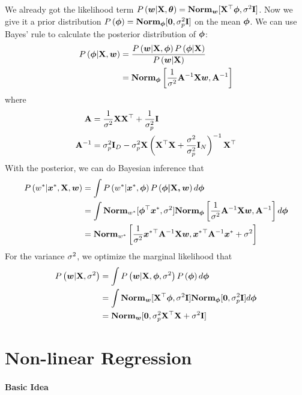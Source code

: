 We already got the likelihood term $P\left(\boldsymbol{w}|\mathbf{X},\boldsymbol{\theta}\right)=\mathbf{Norm}_{\boldsymbol{w}}[\mathbf{X}{}^\top\boldsymbol{\phi},\sigma^2\mathbf{I}]$. Now we give it a prior distribution $P\left(\boldsymbol{\phi}\right)=\mathbf{Norm}_{\boldsymbol{\phi}}[\boldsymbol{0},\sigma_p^2\mathbf{I}]$ on the mean $\boldsymbol{\phi}$. We can use Bayes' rule to calculate the posterior distribution of $\boldsymbol{\phi}$:
\begin{align*}
	P\left(\boldsymbol{\phi}|\mathbf{X},\boldsymbol{w}\right)&=\frac{P\left(\boldsymbol{w}|\mathbf{X},\boldsymbol{\phi}\right)P\left(\boldsymbol{\phi}|\mathbf{X}\right)}{P\left(\boldsymbol{w}|\mathbf{X}\right)} \\
	&=\mathbf{Norm}_{\boldsymbol{\phi}}\left[\frac{1}{\sigma^2}\mathbf{A}^{-1}\mathbf{X}\boldsymbol{w},\mathbf{A}^{-1}\right]
\end{align*}
where
\begin{align*}
	\mathbf{A}&=\frac{1}{\sigma^2}\mathbf{X}\mathbf{X}{}^\top+\frac{1}{\sigma_p^2}\mathbf{I} \\
	\mathbf{A}^{-1}&=\sigma_p^2\mathbf{I}_D-\sigma_p^2\mathbf{X}\left(\mathbf{X}{}^\top\mathbf{X}+\frac{\sigma^2}{\sigma_p^2}\mathbf{I}_N\right)^{-1}\mathbf{X}{}^\top
\end{align*}
With the posterior, we can do Bayesian inference that
\begin{align*}
	P\left(w^*|\boldsymbol{x}^*,\mathbf{X},\boldsymbol{w}\right)&=\int P\left(w^*|\boldsymbol{x}^*,\boldsymbol{\phi}\right)P\left(\boldsymbol{\phi|\mathbf{X},\boldsymbol{w}}\right)d\boldsymbol{\phi} \\
	&=\int\mathbf{Norm}_{w^*}[\boldsymbol{\phi}{}^\top\boldsymbol{x}^*,\sigma^2]\mathbf{Norm}_{\boldsymbol{\phi}}\left[\frac{1}{\sigma^2}\mathbf{A}^{-1}\mathbf{X}\boldsymbol{w},\mathbf{A}^{-1}\right]d\boldsymbol{\phi} \\
	&=\mathbf{Norm}_{w^*}\left[\frac{1}{\sigma^2}\boldsymbol{x}^*{}^\top\mathbf{A}^{-1}\mathbf{X}\boldsymbol{w},\boldsymbol{x}^*{}^\top\mathbf{A}^{-1}\boldsymbol{x}^*+\sigma^2\right]
\end{align*}
For the variance $\sigma^2$, we optimize the marginal likelihood that
\begin{align*}
	P\left(\boldsymbol{w}|\mathbf{X},\sigma^2\right)&=\int P\left(\boldsymbol{w}|\mathbf{X},\boldsymbol{\phi},\sigma^2\right)P\left(\boldsymbol{\phi}\right)d\boldsymbol{\phi} \\
	&=\int\mathbf{Norm}_{\boldsymbol{w}}[\mathbf{X}{}^\top\boldsymbol{\phi},\sigma^2\mathbf{I}]\mathbf{Norm}_{\boldsymbol{\phi}}[\boldsymbol{0},\sigma_p^2\mathbf{I}]d\boldsymbol{\phi} \\
	&=\mathbf{Norm}_{\boldsymbol{w}}[\boldsymbol{0},\sigma_p^2\mathbf{X}{}^\top\mathbf{X}+\sigma^2\mathbf{I}]
\end{align*}



\section{Non-linear Regression}
\label{section6.4}

\paragraph{Basic Idea}

